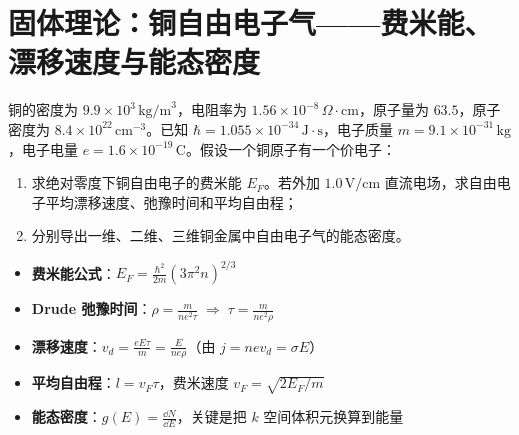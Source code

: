 \section{固体理论：铜自由电子气——费米能、漂移速度与能态密度}
\label{sec:cu-free-electron}

\begin{modelbox}
铜的密度为 $9.9\times10^3\,\text{kg/m}^3$，电阻率为 $1.56\times10^{-8}\,\Omega\cdot\text{cm}$，原子量为 $63.5$，原子密度为 $8.4\times10^{22}\,\text{cm}^{-3}$。已知 $\hbar=1.055\times10^{-34}\,\text{J}\cdot\text{s}$，电子质量 $m=9.1\times10^{-31}\,\text{kg}$，电子电量 $e=1.6\times10^{-19}\,\text{C}$。假设一个铜原子有一个价电子：
\begin{enumerate}
    \item 求绝对零度下铜自由电子的费米能 $E_F$。若外加 $1.0\,\text{V/cm}$ 直流电场，求自由电子平均漂移速度、弛豫时间和平均自由程；
    \item 分别导出一维、二维、三维铜金属中自由电子气的能态密度。
\end{enumerate}
\end{modelbox}

\begin{tipbox}[考点快速分析]
\begin{itemize}
    \item \textbf{费米能公式}：$E_F=\frac{\hbar^2}{2m}(3\pi^2 n)^{2/3}$
    \item \textbf{Drude 弛豫时间}：$\rho=\frac{m}{ne^2\tau}\;\Rightarrow\;\tau=\frac{m}{ne^2\rho}$
    \item \textbf{漂移速度}：$v_d=\frac{eE\tau}{m}=\frac{E}{ne\rho}$（由 $j=ne v_d=\sigma E$）
    \item \textbf{平均自由程}：$l=v_F\tau$，费米速度 $v_F=\sqrt{2E_F/m}$
    \item \textbf{能态密度}：$g(E)=\frac{\dd N}{\dd E}$，关键是把 $k$ 空间体积元换算到能量
\end{itemize}
\end{tipbox}

